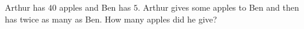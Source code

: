 Arthur has $40$ apples and Ben has $5$. Arthur gives some apples to Ben and then has twice as many as Ben. How many apples did he give?
